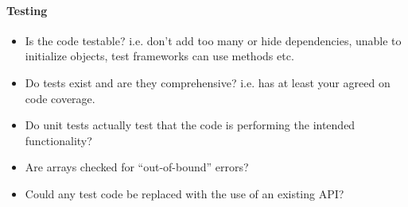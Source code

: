 \paragraph{Testing}

\begin{itemize}
\item Is the code testable? i.e. don't add too many or hide dependencies, unable to initialize objects, test frameworks can use methods etc.
\item Do tests exist and are they comprehensive? i.e. has at least your agreed on code coverage.
\item Do unit tests actually test that the code is performing the intended functionality?
\item Are arrays checked for ``out-of-bound'' errors?
\item Could any test code be replaced with the use of an existing API?
\end{itemize}




